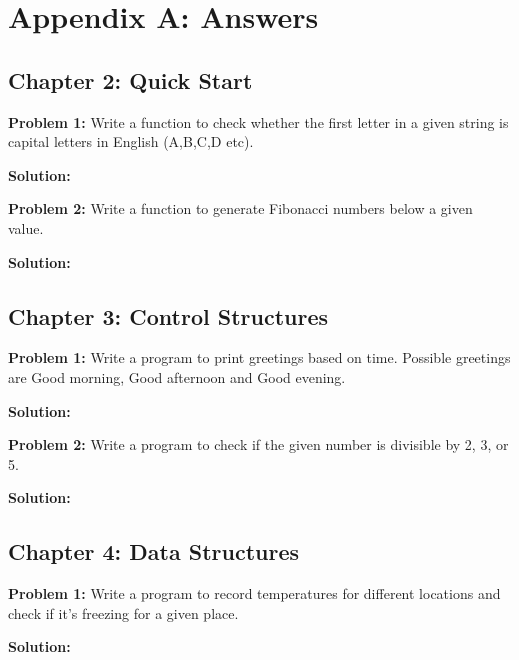 \cleardoublepage
{}
\chapter*{Appendix A: Answers}

\section*{Chapter 2: Quick Start}

\textbf{Problem 1:} Write a function to check whether the first letter
in a given string is capital letters in English (A,B,C,D etc).

\textbf{Solution:}



\textbf{Problem 2:} Write a function to generate Fibonacci numbers
below a given value.

\textbf{Solution:}



\section*{Chapter 3: Control Structures}

\textbf{Problem 1:} Write a program to print greetings based on time.
Possible greetings are Good morning, Good afternoon and Good evening.

\textbf{Solution:}



\textbf{Problem 2:} Write a program to check if the given number is divisible by 2, 3, or 5.

\textbf{Solution:}



\section*{Chapter 4: Data Structures}

\textbf{Problem 1:} Write a program to record temperatures for different locations and check if it's freezing for a given place.

\textbf{Solution:}


